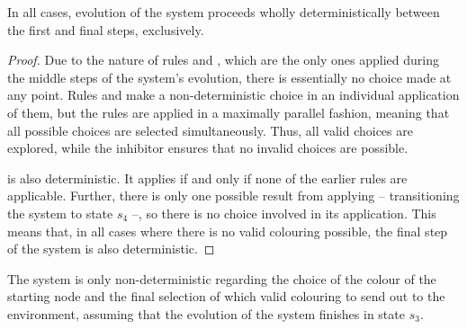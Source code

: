\begin{lemma}\label{lemma:gcol:determin}
In all cases, evolution of the system proceeds wholly deterministically between the first and final steps, exclusively.
\end{lemma}

\begin{proof}
Due to the nature of rules  and , which are the only ones applied during the middle steps of the system's evolution, there is essentially no choice made at any point.  Rules  and  make a non-deterministic choice in an individual application of them, but the rules are applied in a maximally parallel fashion, meaning that all possible choices are selected simultaneously.  Thus, all valid choices are explored, while the \gls{inhibitor} ensures that no invalid choices are possible.


 is also deterministic.  It applies if and only if none of the earlier rules are applicable.  Further, there is only one possible result from applying  -- transitioning the system to state \(s_4\) --, so there is no choice involved in its application.  This means that, in all cases where there is no valid colouring possible, the final step of the system is also deterministic.

\end{proof}

\begin{lemma}\label{lemma:gcol:nondet}

The system is only non-deterministic regarding the choice of the colour of the starting node and the final selection of which valid colouring to send out to the environment, assuming that the evolution of the system finishes in state \(s_3\).
\end{lemma}

